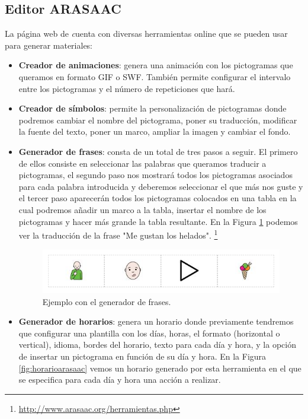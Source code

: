 \subsection{Editor ARASAAC}
La página web de \textit cuenta con diversas herramientas online que se pueden usar para generar materiales:
\begin{itemize}
\item \textbf{Creador de animaciones}: genera una animación con los pictogramas que queramos en formato GIF o SWF. También permite configurar el intervalo entre los pictogramas y el número de repeticiones que hará.

\item \textbf{Creador de símbolos}: permite la personalización de pictogramas donde podremos cambiar el nombre del pictograma, poner su traducción, modificar la fuente del texto, poner un marco, ampliar la imagen y cambiar el fondo.

\item \textbf{Generador de frases}: consta de un total de tres pasos a seguir. El primero de ellos consiste en seleccionar las palabras que queramos traducir a pictogramas, el segundo paso nos mostrará todos los pictogramas asociados para cada palabra introducida y deberemos seleccionar el que más nos guste y el tercer paso aparecerán todos los pictogramas colocados en una tabla en la cual podremos añadir un marco a la tabla, insertar el nombre de los pictogramas y hacer más grande la tabla resultante. En la Figura \ref{fig:frase-arasaac} podemos ver la traducción de la frase "Me gustan los helados".
\footnote{\url{http://www.arasaac.org/herramientas.php}}

\begin{figure}[h!]
	\centering
	\includegraphics[width=0.7\linewidth]{Imagenes/Bitmap/Frase ARASAAC}
	\caption{Ejemplo con el generador de frases.}
	\label{fig:frase-arasaac}
\end{figure}


\item \textbf{Generador de horarios}: genera un horario donde previamente tendremos que configurar una plantilla con los días, horas, el formato (horizontal o vertical), idioma, bordes del horario, texto para cada día y hora, y la opción de insertar un pictograma en función de su día y hora. En la Figura \ref{fig:horarioarasaac} vemos un horario generado por esta herramienta en el que se especifica para cada día y hora una acción a realizar.


\end{itemize}
